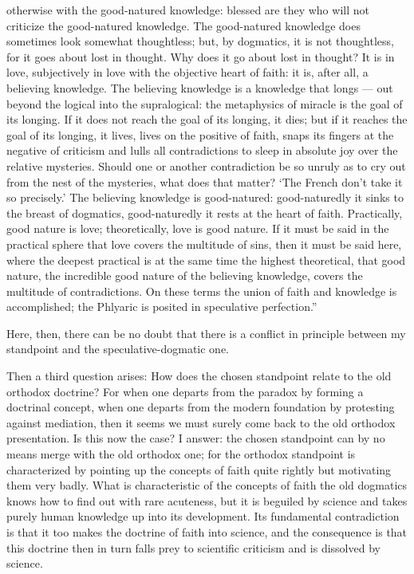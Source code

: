 \documentclass[12pt]{book}
\newcommand{\opage}[1]{\marginnote{\footnotesize\textit{[#1]}}}
\begin{document}
otherwise with the good-natured knowledge: blessed are they who will not
criticize the good-natured knowledge. The good-natured knowledge does
sometimes look somewhat thoughtless; but, by dogmatics, it is not
thoughtless, for it goes about lost in thought. Why does it go about lost in
thought? It is in love, subjectively in love with the objective heart of
faith: it is, after all, a believing knowledge. The believing knowledge is a
knowledge that longs --- out beyond the logical into the supralogical: the
metaphysics of miracle is the goal of its longing. If it does not reach the
goal of its longing, it dies; but if it reaches the goal of its longing, it
lives, lives on the positive of faith, snaps its fingers at the negative of
criticism and lulls all contradictions to sleep in absolute joy over the
relative mysteries. Should one or another contradiction be so unruly as to
cry out from the nest of the mysteries, what does that matter? `The French
don't take it so precisely.' The believing knowledge is good-natured:
good-naturedly it sinks to the breast of dogmatics, good-naturedly it rests at
the heart of faith. Practically, good nature is love; theoretically, love is
good nature. If it must be said in the practical sphere that love covers the
multitude of sins, then it must
be said here, where the deepest practical is at the same time the highest
theoretical, that good nature, the incredible good nature of the believing
knowledge, covers the multitude of contradictions. On these terms the union of
faith and
\opage{245}\setcounter{footnote}{0}%
knowledge is accomplished; the Phlyaric is posited in speculative
perfection.''

Here, then, there can be no doubt that there is a conflict in principle
between my standpoint and the speculative-dogmatic one.

Then a third question arises: How does the chosen standpoint relate to the old
orthodox doctrine? For when one departs from the paradox by forming a
doctrinal concept, when one departs from the modern foundation by protesting
against mediation, then it seems we must surely come back to the old orthodox
presentation. Is this now the case? I answer: the chosen standpoint can by no
means merge with the old orthodox one; for the orthodox standpoint is
characterized by pointing up the concepts of faith quite rightly but
motivating them very badly. What is characteristic of the concepts of faith
the old dogmatics knows how to find out with rare acuteness, but it is
beguiled by science and takes purely human knowledge up into its development.
Its fundamental contradiction is that it too makes the doctrine of faith into
science, and the consequence is that this doctrine then in turn falls prey to
scientific criticism and is dissolved by science.
\end{document}
